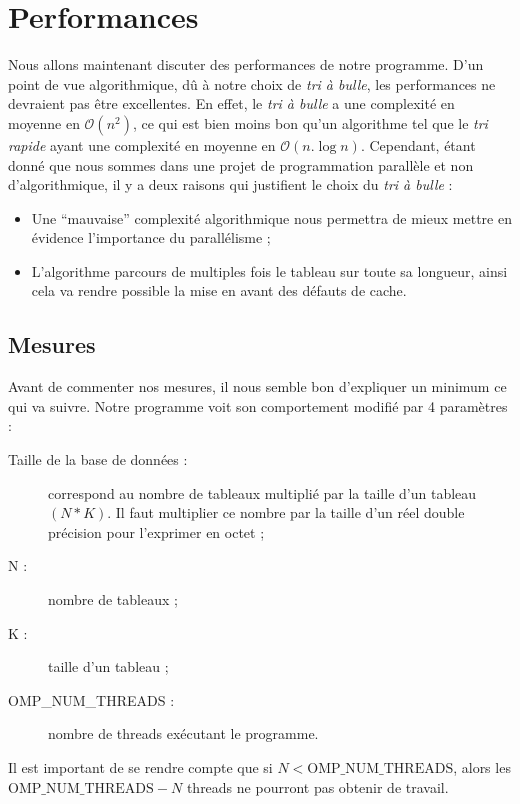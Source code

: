 \documentclass[12pt]{article}
\begin{document}
\section{Performances}

Nous allons maintenant discuter des performances de notre programme. D'un
point de vue algorithmique, dû à notre choix de \emph{tri à bulle}, les
performances ne devraient pas être excellentes. En effet, le \emph{tri à bulle}
a une complexité en moyenne en $\mathcal{O}(n^2)$, ce qui est bien moins bon
qu'un algorithme tel que le \emph{tri rapide} ayant une complexité en moyenne en
$\mathcal{O}(n.\log n)$. Cependant, étant donné que nous sommes dans une projet
de programmation parallèle et non d'algorithmique, il y a deux raisons qui
justifient le choix du \emph{tri à bulle} :
\begin{itemize}
    \item Une \enquote{mauvaise} complexité algorithmique nous permettra de mieux
        mettre en évidence l'importance du parallélisme ;
    \item L'algorithme parcours de multiples fois le tableau sur toute sa
        longueur, ainsi cela va rendre possible la mise en avant des défauts de
        cache.
\end{itemize}

\subsection{Mesures}

Avant de commenter nos mesures, il nous semble bon d'expliquer un minimum ce qui
va suivre. Notre programme voit son comportement modifié par 4 paramètres :
\begin{description}
    \item[Taille de la base de données :]{correspond au nombre de tableaux
        multiplié par la taille d'un tableau $(N*K)$. Il faut multiplier ce
        nombre par la taille d'un réel double précision pour l'exprimer en
        octet ;}
    \item[N :]{nombre de tableaux ;}
    \item[K :]{taille d'un tableau ;}
    \item[OMP\_NUM\_THREADS :]{nombre de threads exécutant le programme.}
\end{description}

Il est important de se rendre compte que si $N < \text{OMP\_NUM\_THREADS}$,
alors les $\text{OMP\_NUM\_THREADS} - N$ threads ne pourront pas obtenir de
travail.
\end{document}
